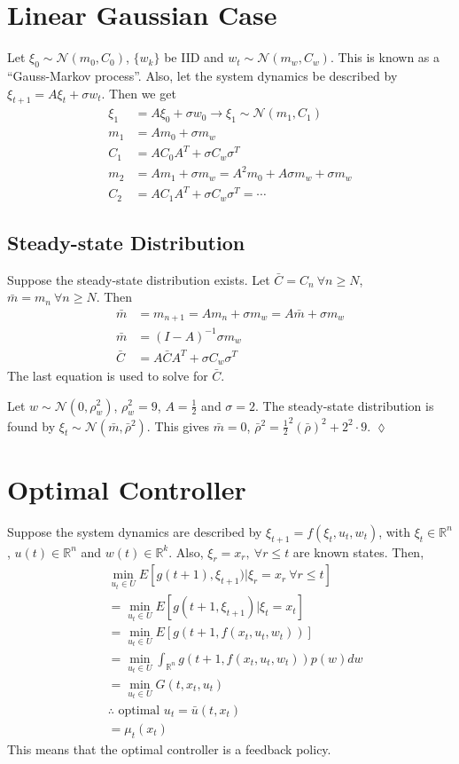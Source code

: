 \section{Linear Gaussian Case}
Let $\xi_0 \sim \mathcal{N}(m_0,C_0)$, $\{w_k\}$ be IID and $w_t \sim \mathcal{N}(m_w,C_w)$. This is known as a ``Gauss-Markov process''. Also, let the system dynamics be described by $\xi_{t+1}=A\xi_t+\sigma w_t$. Then we get
\begin{align*}
\xi_1 &= A\xi_0+\sigma w_0 \rightarrow \xi_1 \sim \mathcal{N}(m_1,C_1) \\
m_1 &= Am_0+\sigma m_w \\
C_1 &= AC_0A^T + \sigma C_w\sigma^T \\
m_2 &= Am_1 + \sigma m_w = A^2m_0 + A\sigma m_w + \sigma m_w \\
C_2 &= AC_1A^T + \sigma C_w\sigma^T = \cdots
\end{align*}

\subsection{Steady-state Distribution}
Suppose the steady-state distribution exists. Let $\bar{C} = C_n ~\forall n\geq N$, $\bar{m} = m_n ~\forall n\geq N$. Then
\begin{align*}
\bar{m} &= m_{n+1} = Am_n + \sigma m_w = A\bar{m} + \sigma m_w \\
\bar{m} &= (I-A)^{-1}\sigma m_w \\
\bar{C} &= A\bar{C}A^T + \sigma C_w\sigma^T
\end{align*}
The last equation is used to solve for $\bar{C}$.

\begin{example}
Let $w\sim\mathcal{N}(0,\rho_w^2)$, $\rho_w^2=9$, $A=\frac{1}{2}$ and $\sigma=2$. The steady-state distribution is found by $\xi_t \sim\mathcal{N}(\bar{m}, \bar{\rho}^2)$. This gives $\bar{m}=0$, $\bar{\rho}^2 = \frac{1}{2}^2(\bar{\rho})^2 + 2^2\cdot 9$.
$\lozenge$
\end{example}

\section{Optimal Controller}
Suppose the system dynamics are described by $\xi_{t+1} = f(\xi_t,u_t,w_t)$, with $\xi_t\in\mathbb{R}^n$, $u(t)\in\mathbb{R}^n$ and $w(t)\in\mathbb{R}^k$. Also, $\xi_r=x_r, ~\forall r\leq t$ are known states. Then,
\begin{align*}
&\min_{u_t\in U} E[g(t+1),\xi_{t+1}) | \xi_r=x_r ~\forall r\leq t] \\
&= \min_{u_t\in U} E[g(t+1,\xi_{t+1}) | \xi_t=x_t] \\
&= \min_{u_t\in U} E[g(t+1, f(x_t,u_t,w_t))] \\
&= \min_{u_t\in U} \int_{\mathbb{R}^n} g(t+1,f(x_t,u_t,w_t))p(w)dw \\
&= \min_{u_t\in U} G(t,x_t,u_t) \\
&\therefore \text{ optimal } u_t=\bar{u}(t,x_t) \\
&= \mu_t(x_t)
\end{align*}
This means that the optimal controller is a feedback policy.

